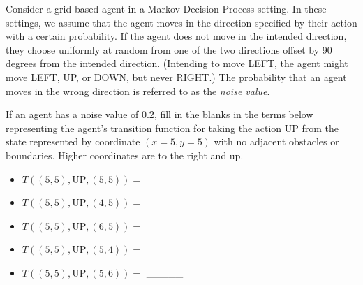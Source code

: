 \documentclass{worksheet}
\begin{document}
\begin{question}[Expectimax][]
\begin{center}
\end{center}    

\end{question}





\begin{question}
Consider a grid-based agent in a Markov Decision Process setting. In these settings, we assume that the agent moves in the direction specified by their action with a certain probability. If the agent does not move in the intended direction, they choose uniformly at random from one of the two directions offset by 90 degrees from the intended direction. (Intending to move LEFT, the agent might move LEFT, UP, or DOWN, but never RIGHT.) The probability that an agent moves in the wrong direction is referred to as the \textit{noise value}.

If an agent has a noise value of $0.2$, fill in the blanks in the terms below representing the agent's transition function for taking the action UP from the state represented by coordinate $(x=5, y=5)$ with no adjacent obstacles or boundaries. Higher coordinates are to the right and up.

\begin{itemize}
    \item $T((5, 5), \text{UP}, (5, 5)) = $ \_\_\_\_\_
    \item $T((5, 5), \text{UP}, (4, 5)) = $ \_\_\_\_\_
    \item $T((5, 5), \text{UP}, (6, 5)) = $ \_\_\_\_\_
    \item $T((5, 5), \text{UP}, (5, 4)) = $ \_\_\_\_\_
    \item $T((5, 5), \text{UP}, (5, 6)) = $ \_\_\_\_\_
\end{itemize}
    
\end{question}
\end{document}
